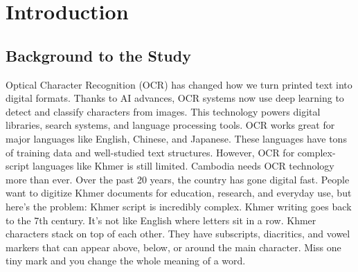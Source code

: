 \clearpage
{}
\setcounter{page}{1}

\label{ch:intro}
\chapter{Introduction}


\section{Background to the Study}
\label{sec:background}

Optical Character Recognition (OCR) has changed how we 
turn printed text into digital formats. Thanks to AI 
advances, OCR systems now use deep learning to detect 
and classify characters from images. This technology 
powers digital libraries, search systems, and language 
processing tools.
OCR works great for major languages like English, 
Chinese, and Japanese. These languages have tons 
of training data and well-studied text structures. 
However, OCR for complex-script languages like Khmer
is still limited.
Cambodia needs OCR technology more than ever. 
Over the past 20 years, the country has gone digital 
fast. People want to digitize Khmer documents for 
education, research, and everyday use, but here's 
the problem: Khmer script is incredibly complex.
Khmer writing goes back to the 7th century. It's 
not like English where letters sit in a row. Khmer 
characters stack on top of each other. They have 
subscripts, diacritics, and vowel markers that can 
appear above, below, or around the main character. 
Miss one tiny mark and you change the whole meaning 
of a word.

